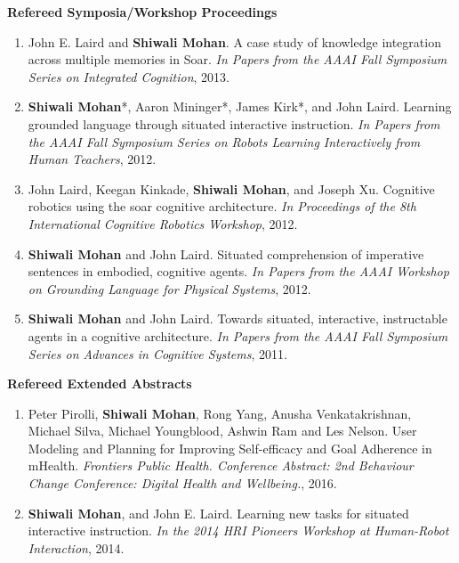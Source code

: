 \documentclass[margin,line,11pt]{res}
\begin{document}
\begin{resume}
                  \textbf{Refereed Symposia/Workshop Proceedings}
                  \begin{enumerate}[label=\lbrack W\arabic*\rbrack:,leftmargin=*]
                  \item John E. Laird and \textbf{Shiwali Mohan}. A case study of knowledge integration across multiple memories in
                    Soar. \emph{In Papers from the AAAI Fall Symposium Series on Integrated Cognition}, 2013.
                  \item \textbf{Shiwali Mohan}*, Aaron Mininger*, James Kirk*, and John Laird. Learning grounded language through
                    situated interactive instruction. \emph{In Papers from the AAAI Fall Symposium Series on Robots Learning Interactively from Human Teachers}, 2012.
                  \item John Laird, Keegan Kinkade, \textbf{Shiwali Mohan}, and Joseph Xu. Cognitive robotics using the soar cognitive
                    architecture. \emph{In Proceedings of the 8th International Cognitive Robotics Workshop}, 2012.
                  \item \textbf{Shiwali Mohan} and John Laird. Situated comprehension of imperative sentences in embodied, cognitive
                    agents. \emph{In Papers from the AAAI Workshop on Grounding Language for Physical Systems}, 2012.
                  \item \textbf{Shiwali Mohan} and John Laird. Towards situated, interactive, instructable agents in a cognitive architecture. \emph{In Papers from the AAAI Fall Symposium Series on Advances in Cognitive Systems}, 2011.
                  \end{enumerate}


                  \textbf{Refereed Extended Abstracts}
                  \begin{enumerate}[label=\lbrack A\arabic*\rbrack,leftmargin=*]

                  \item Peter Pirolli, \textbf{Shiwali Mohan}, Rong Yang, Anusha Venkatakrishnan, Michael Silva, Michael Youngblood, Ashwin Ram and Les Nelson. User Modeling and Planning for Improving Self-efficacy and Goal Adherence in mHealth. \emph{Frontiers Public Health. Conference Abstract: 2nd Behaviour Change Conference: Digital Health and Wellbeing.}, 2016.
                    
                  \item \textbf{Shiwali Mohan}, and John E. Laird. Learning new tasks for situated interactive instruction. \emph{In the 2014 HRI Pioneers Workshop at Human-Robot Interaction}, 2014.


\end{enumerate}
\end{resume}
\end{document}
